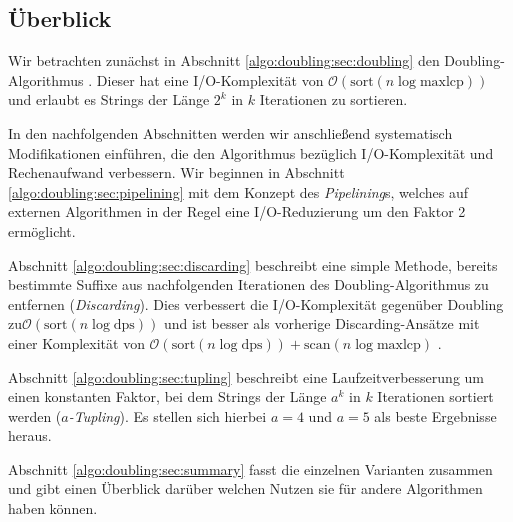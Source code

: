 \subsection{Überblick}

Wir betrachten zunächst in Abschnitt \ref{algo:doubling:sec:doubling} den Doubling-Algorithmus \cite{Arge1997}\cite{Crauser2002}. Dieser hat eine I/O-Komplexität von $\mathcal{O}(\text{sort}(n \log \text{maxlcp}))$ und erlaubt es Strings der Länge $2^k$ in $k$ Iterationen zu sortieren.

In den nachfolgenden Abschnitten werden wir anschließend systematisch Modifikationen einführen, die den Algorithmus bezüglich I/O-Komplexität und Rechenaufwand verbessern. Wir beginnen in Abschnitt \ref{algo:doubling:sec:pipelining} mit dem Konzept des \textit{Pipelining}s, welches auf externen Algorithmen in der Regel eine I/O-Reduzierung um den Faktor 2 ermöglicht.

Abschnitt \ref{algo:doubling:sec:discarding} beschreibt eine simple Methode, bereits bestimmte Suffixe aus nachfolgenden Iterationen des Doubling-Algorithmus zu entfernen (\textit{Discarding}). Dies verbessert die I/O-Komplexität gegenüber Doubling zu\newline $\mathcal{O}(\text{sort}(n \log \text{dps}))$ und ist besser als vorherige Discarding-Ansätze mit einer Komplexität von $\mathcal{O}(\text{sort}(n \log \text{dps})) + \text{scan}(n \log \text{maxlcp})$ \cite{Crauser2002}.

Abschnitt \ref{algo:doubling:sec:tupling} beschreibt eine Laufzeitverbesserung um einen konstanten Faktor, bei dem Strings der Länge $a^k$ in $k$ Iterationen sortiert werden (\textit{$a$-Tupling}). Es stellen sich hierbei $a = 4$ und $a = 5$ als beste Ergebnisse heraus.

Abschnitt \ref{algo:doubling:sec:summary} fasst die einzelnen Varianten zusammen und gibt einen Überblick darüber welchen Nutzen sie für andere Algorithmen haben können.

